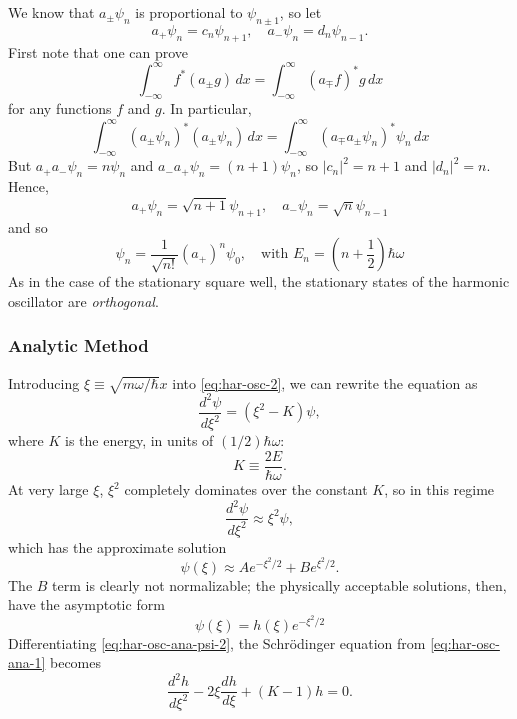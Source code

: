 \documentclass{article}
\begin{document}
We know that $a_{\pm}\psi_n$ is proportional to $\psi_{n \pm 1}$, so let
\begin{equation} \label{eq:har-osc-alg-sta-st-2}
  a_+\psi_n = c_n\psi_{n + 1}, \quad a_-\psi_n = d_n\psi_{n - 1}.
\end{equation}
First note that one can prove
\begin{equation} \label{eq:har-osc-alg-sta-st-3}
  \int_{-\infty}^{\infty} f^*(a_{\pm}g) \,dx
  = \int_{-\infty}^{\infty} (a_{\mp}f)^*g \,dx
\end{equation}
for any functions $f$ and $g$. In particular, \[
  \int_{-\infty}^{\infty} (a_{\pm}\psi_n)^*(a_{\pm}\psi_n) \,dx
  = \int_{-\infty}^{\infty} (a_{\mp}a_{\pm}\psi_n)^*\psi_n \,dx
\] But $a_+a_-\psi_n = n\psi_n$ and $a_-a_+\psi_n = (n + 1)\psi_n$, so $|c_n|^2
= n + 1$ and $|d_n|^2 = n$. Hence,
\begin{equation} \label{eq:har-osc-alg-op}
  \boxed{
    a_+\psi_n = \sqrt{n + 1}\psi_{n + 1}, \quad
    a_-\psi_n = \sqrt{n}\psi_{n - 1}
  }
\end{equation}
and so
\begin{equation} \label{eq:har-osc-alg-sta-st}
  \boxed{
    \psi_n = \frac{1}{\sqrt{n!}}(a_+)^n\psi_0, \quad
    \text{with } E_n = \left(n + \frac{1}{2}\right)\hbar\omega
  }
\end{equation}
As in the case of the stationary square well, the stationary states of the
harmonic oscillator are \emph{orthogonal}.

\subsubsection{Analytic Method}

Introducing $\xi \equiv \sqrt{m\omega/\hbar}x$ into \eqref{eq:har-osc-2}, we
can rewrite the equation as
\begin{equation} \label{eq:har-osc-ana-1}
  \frac{d^2\psi}{d\xi^2} = (\xi^2 - K)\psi,
\end{equation} where $K$ is the energy, in units of $(1/2)\hbar\omega$:
\begin{equation} \label{eq:har-osc-ana-k}
  K \equiv \frac{2E}{\hbar\omega}.
\end{equation}
At very large $\xi$, $\xi^2$ completely dominates over the constant $K$, so in
this regime
\begin{equation} \label{eq:har-osc-ana-2}
  \frac{d^2\psi}{d\xi^2} \approx \xi^2\psi,
\end{equation}
which has the approximate solution
\begin{equation} \label{eq:har-osc-ana-psi-1}
  \psi(\xi) \approx Ae^{-\xi^2/2} + Be^{\xi^2/2}.
\end{equation}
The $B$ term is clearly not normalizable; the physically acceptable solutions,
then, have the asymptotic form
\begin{equation} \label{eq:har-osc-ana-psi-2}
  \psi(\xi) = h(\xi)e^{-\xi^2/2}
\end{equation}
Differentiating \eqref{eq:har-osc-ana-psi-2}, the Schr\"{o}dinger equation from
\eqref{eq:har-osc-ana-1} becomes
\begin{equation} \label{eq:har-osc-ana-3}
  \frac{d^2h}{d\xi^2} - 2\xi\frac{dh}{d\xi} + (K - 1)h = 0.
\end{equation}
\end{document}
